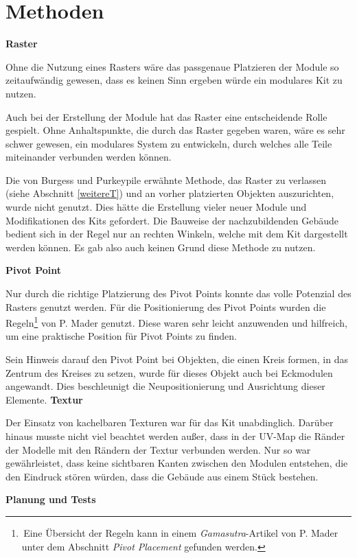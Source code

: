 \section{Methoden}
\par\textbf{Raster}\par
Ohne die Nutzung eines Rasters wäre das passgenaue Platzieren der Module so zeitaufwändig gewesen, dass es keinen Sinn ergeben würde ein modulares Kit zu nutzen.
\par
Auch bei der Erstellung der Module hat das Raster eine entscheidende Rolle gespielt. Ohne Anhaltspunkte, die durch das Raster gegeben waren, wäre es sehr schwer gewesen, ein modulares System zu entwickeln, durch welches alle Teile miteinander verbunden werden können.
\par
Die von Burgess und Purkeypile erwähnte Methode, das Raster zu verlassen (siehe Abschnitt \ref{weitereT}) und an vorher platzierten Objekten auszurichten, wurde nicht genutzt. Dies hätte die Erstellung vieler neuer Module und Modifikationen  des Kits gefordert. Die Bauweise der nachzubildenden Gebäude bedient sich in der Regel nur an rechten Winkeln, welche mit dem Kit dargestellt werden können. Es gab also auch keinen Grund diese Methode zu nutzen.
\par\textbf{Pivot Point}\par
Nur durch die richtige Platzierung des Pivot Points konnte das volle Potenzial des Rasters genutzt werden. Für die Positionierung des Pivot Points wurden die Regeln\footnote{\,Eine Übersicht der Regeln kann in einem \textit{Gamasutra}-Artikel \parencite{Mader} von P. Mader unter dem Abschnitt \textit{Pivot Placement} gefunden werden.} von P. Mader genutzt. Diese waren sehr leicht anzuwenden und hilfreich, um eine praktische Position für Pivot Points zu finden.
\par
Sein Hinweis darauf den Pivot Point bei Objekten, die einen Kreis formen, in das Zentrum des Kreises zu setzen, wurde für dieses Objekt auch bei Eckmodulen angewandt. Dies beschleunigt die Neupositionierung und Ausrichtung dieser Elemente.
\newpage
\textbf{Textur}\par
Der Einsatz von kachelbaren Texturen war für das Kit unabdinglich. Darüber hinaus musste nicht viel beachtet werden außer, dass in der UV-Map die Ränder der Modelle mit den Rändern der Textur verbunden werden. Nur so war gewährleistet, dass keine sichtbaren Kanten zwischen den Modulen entstehen, die den Eindruck stören würden, dass die Gebäude aus einem Stück bestehen.
\par\textbf{Planung und Tests}\par
